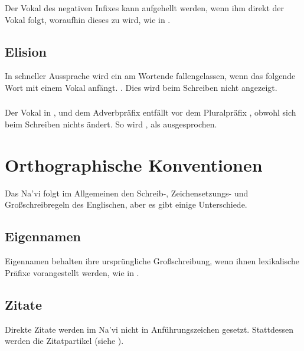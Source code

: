 \subsubsection{} Der Vokal des negativen Infixes  kann aufgehellt
werden, wenn ihm direkt der Vokal  folgt, woraufhin dieses zu  wird,
wie in .\label{l-and-s:eng} 

\subsection{Elision} In schneller Aussprache wird ein  am Wortende
fallengelassen, wenn das folgende Wort mit einem Vokal anf\"angt. . Dies wird beim Schreiben nicht angezeigt.

\subsubsection{} Der Vokal  in ,  und dem Adverbpr\"afix 
entf\"allt vor dem Pluralpr\"afix , obwohl sich beim Schreiben nichts
\"andert. So wird ,  als  ausgesprochen.\label{l-and-s:elision-i} 



\section{Orthographische Konventionen}
\noindent Das Na’vi folgt im Allgemeinen den Schreib-, Zeichensetzungs- und
Gro\ss{}schreibregeln des Englischen, aber es gibt einige Unterschiede.

\subsection{Eigennamen} Eigennamen behalten ihre urspr\"ungliche Gro\ss{}schreibung,
wenn ihnen lexikalische Pr\"afixe vorangestellt werden, wie in .

\subsection{Zitate} Direkte Zitate werden im Na’vi nicht in Anf\"uhrungszeichen
gesetzt. Stattdessen werden die Zitatpartikel  (siehe ).

